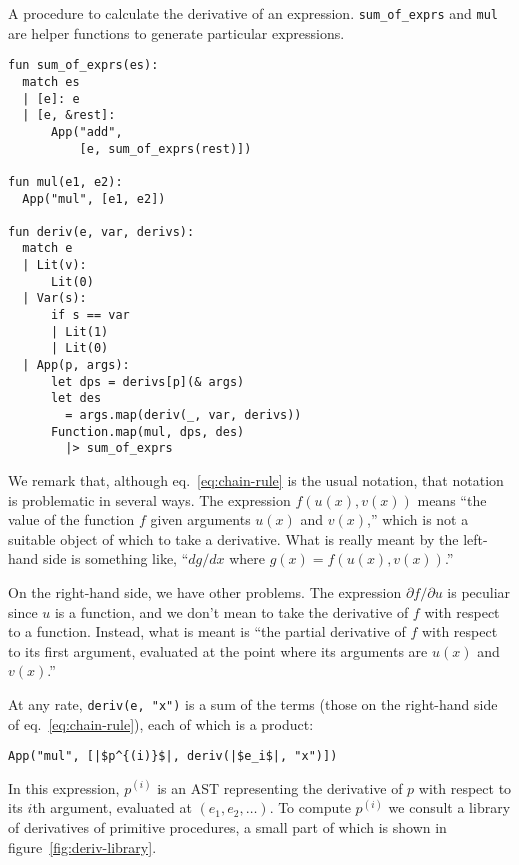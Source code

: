 \documentclass[11pt, a4paper]{article}
\newcommand{\cd}[1]{\texttt{#1}}
\begin{document}
\begin{marginfigure}
  \caption{A procedure to calculate the derivative of an
    expression. \cd{sum_of_exprs} and \cd{mul} are helper functions to
    generate particular expressions.\label{fig:deriv}}
  \footnotesize%
\begin{verbatim}
fun sum_of_exprs(es):
  match es
  | [e]: e
  | [e, &rest]:
      App("add",
          [e, sum_of_exprs(rest)])

fun mul(e1, e2):
  App("mul", [e1, e2])

fun deriv(e, var, derivs):
  match e
  | Lit(v):
      Lit(0)
  | Var(s):
      if s == var
      | Lit(1)
      | Lit(0)
  | App(p, args):
      let dps = derivs[p](& args)
      let des
        = args.map(deriv(_, var, derivs))
      Function.map(mul, dps, des)
        |> sum_of_exprs 
\end{verbatim}
\end{marginfigure}
We remark that, although eq.~\eqref{eq:chain-rule} is the usual
notation, that notation is problematic in several ways. The expression
$f(u(x), v(x))$ means ``the value of the function $f$ given arguments
$u(x)$ and $v(x)$,'' which is not a suitable object of which to take a
derivative. What is really meant by the left-hand side is something
like, ``$dg/dx$ where $g(x) = f(u(x),v(x))$.''

On the right-hand side, we have other problems. The expression
$\partial f/\partial u$ is peculiar since $u$ is a function, and we don't mean to
take the derivative of $f$ with respect to a function. Instead, what
is meant is ``the partial derivative of $f$ with respect to its first
argument, evaluated at the point where its arguments are $u(x)$
and~$v(x)$.''

At any rate, \cd{deriv(e, "x")} is a sum of the terms (those on the
right-hand side of eq.~\eqref{eq:chain-rule}), each of which is a
product:
\begin{verbatim}
App("mul", [|$p^{(i)}$|, deriv(|$e_i$|, "x")])
\end{verbatim}

In this expression, $p^{(i)}$ is an AST representing the derivative of
$p$ with respect to its $i$th argument, evaluated at
$(e_1, e_2, \dotsc)$. To compute $p^{(i)}$ we consult a library of
derivatives of primitive procedures, a small part of which is shown in
figure~\ref{fig:deriv-library}.
\end{document}
